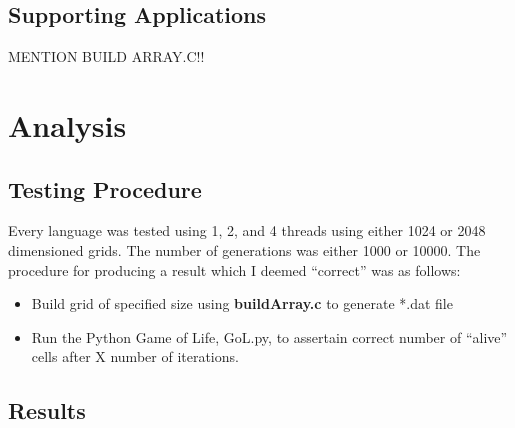 \documentclass[11pt]{article} %
\begin{document}
\subsection{Supporting Applications}
MENTION BUILD ARRAY.C!!

\section{Analysis}
\subsection{Testing Procedure}
Every language was tested using 1, 2, and 4 threads using either 1024 or 2048 dimensioned grids. The number of generations was either 1000 or 10000. The procedure for producing a result which I deemed ``correct'' was as follows:
\begin{itemize}
\item Build grid of specified size using {\bf buildArray.c} to generate *.dat file
\item Run the Python Game of Life, GoL.py, to assertain correct number of ``alive'' cells after X number of iterations.
\end{itemize}
\subsection{Results}
\end{document}
